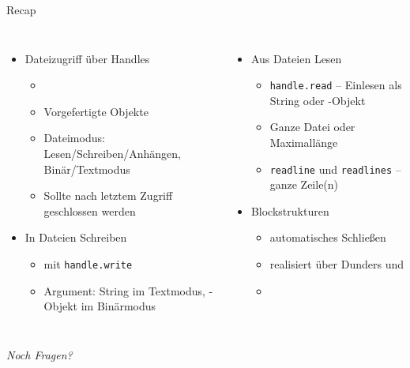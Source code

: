 
\begin{frame}[t,plain]
\titlepage
\end{frame}


\begin{frame}{Recap}
%
\begin{columns}[T]
\begin{itemize}
\item Dateizugriff über Handles
	\begin{itemize}
	\item {}
	\item Vorgefertigte Objekte
	\item Dateimodus: Lesen/Schreiben/Anhängen, Binär/Textmodus
	\item Sollte nach letztem Zugriff geschlossen werden
	\end{itemize}
\item In Dateien Schreiben
	\begin{itemize}
	\item mit \texttt{handle.write}
	\item Argument: String im Textmodus, -Objekt im Binärmodus
	\end{itemize}
\end{itemize}
%
\begin{itemize}
\item Aus Dateien Lesen
	\begin{itemize}
	\item \texttt{handle.read} -- Einlesen als String oder -Objekt
	\item Ganze Datei oder Maximallänge
	\item \texttt{readline} und \texttt{readlines} -- ganze Zeile(n)
	\end{itemize}
\item Blockstrukturen
	\begin{itemize}
	\item {} automatisches Schließen
	\item realisiert über Dunders  und 
	\item {}
	\end{itemize}
\end{itemize}
\end{columns}
%
\begin{center}
	\emph{Noch Fragen?}
\end{center}
%
\end{frame}

